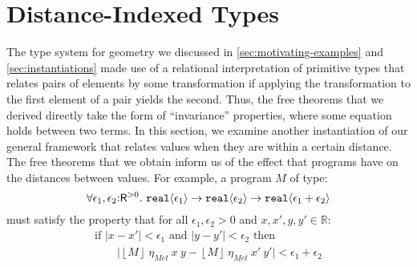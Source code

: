 \documentclass{sigplanconf}
\newcommand{\abs}[1]{\lvert #1 \rvert}
\newcommand{\tyPrim}[2]{\textup{\texttt{#1}}\langle #2 \rangle}
\newcommand{\tmSem}[1]{\left\lfloor{#1}\right\rfloor}
\theoremstyle{examplestyle}
\theoremstyle{restatementstyle}
\begin{document}
\section{Distance-Indexed Types}
\label{sec:metric-types}

\newcommand{\Metric}{\mathit{Met}}
\newcommand{\metricSort}{\mathsf{R}^{>0}}

The type system for geometry we discussed in
\autoref{sec:motivating-examples} and \autoref{sec:instantiations}
made use of a relational interpretation of primitive types that
relates pairs of elements by some transformation if applying the
transformation to the first element of a pair yields the second. Thus,
the free theorems that we derived directly take the form of
``invariance'' properties, where some equation holds between two
terms. In this section, we examine another instantiation of our
general framework that relates values when they are within a certain
distance. The free theorems that we obtain inform us of the effect
that programs have on the distances between values. For example, a
program $M$ of type:
\begin{displaymath}
  \forall \epsilon_1,\epsilon_2\mathord:\metricSort.\ \tyPrim{real}{\epsilon_1} \to \tyPrim{real}{\epsilon_2} \to \tyPrim{real}{\epsilon_1 + \epsilon_2}
\end{displaymath}
must satisfy the property that for all $\epsilon_1, \epsilon_2 > 0$
and $x, x', y, y' \in \mathbb{R}$:
\begin{displaymath}
  \begin{array}{l}
    \textrm{if }\abs{x - x'} < \epsilon_1 \textrm{ and } \abs{y - y'} < \epsilon_2 \textrm{ then}\\
    \hspace{2em}\abs{\tmSem{M}\ \eta_\Metric\ x\ y - \tmSem{M}\ \eta_\Metric\ x'\ y'} < \epsilon_1 + \epsilon_2
  \end{array}
\end{displaymath}
\end{document}
